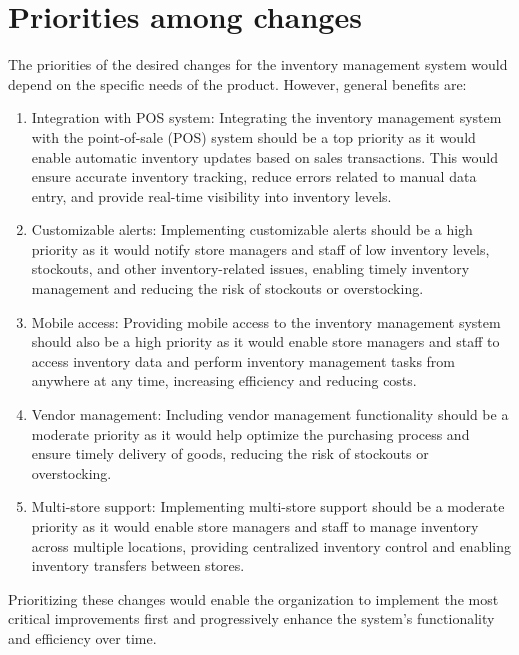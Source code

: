 \section{Priorities among changes \label{Section::Prioritiesamongchanges}}
The priorities of the desired changes for the inventory management system would depend on the specific needs of the product. However, general benefits are:

\begin{enumerate}

    \item Integration with POS system: Integrating the inventory management system with the point-of-sale (POS) system should be a top priority as it would enable automatic inventory updates based on sales transactions. This would ensure accurate inventory tracking, reduce errors related to manual data entry, and provide real-time visibility into inventory levels.

    \item Customizable alerts: Implementing customizable alerts should be a high priority as it would notify store managers and staff of low inventory levels, stockouts, and other inventory-related issues, enabling timely inventory management and reducing the risk of stockouts or overstocking.

    \item Mobile access: Providing mobile access to the inventory management system should also be a high priority as it would enable store managers and staff to access inventory data and perform inventory management tasks from anywhere at any time, increasing efficiency and reducing costs.

    \item Vendor management: Including vendor management functionality should be a moderate priority as it would help optimize the purchasing process and ensure timely delivery of goods, reducing the risk of stockouts or overstocking.

    \item Multi-store support: Implementing multi-store support should be a moderate priority as it would enable store managers and staff to manage inventory across multiple locations, providing centralized inventory control and enabling inventory transfers between stores.

\end{enumerate}
Prioritizing these changes would enable the organization to implement the most critical improvements first and progressively enhance the system's functionality and efficiency over time.

